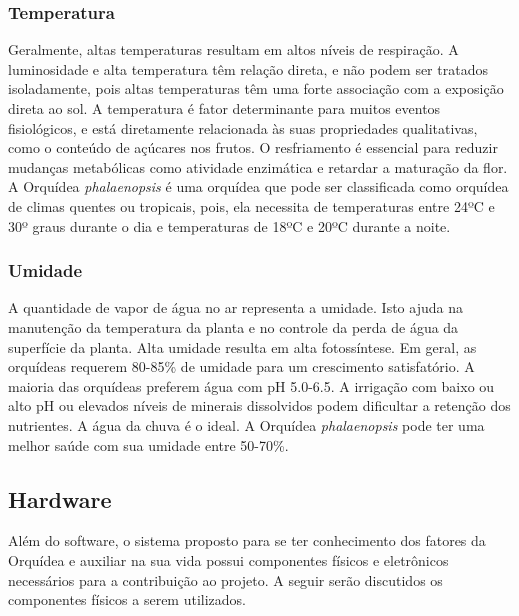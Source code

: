 \documentclass[conference]{IEEEtran}
\begin{document}
\subsubsection{Temperatura}
Geralmente, altas temperaturas resultam em altos níveis de respiração. A luminosidade e alta temperatura têm relação direta, e não podem ser tratados isoladamente, pois altas temperaturas têm uma forte associação com a exposição direta ao sol. A temperatura é fator determinante para muitos eventos fisiológicos, e está diretamente relacionada às suas propriedades qualitativas, como o conteúdo de açúcares nos frutos. O resfriamento é essencial para reduzir mudanças metabólicas como atividade enzimática e retardar a maturação da flor. \cite{b3, b4, b5} A Orquídea {\itshape{phalaenopsis}} é uma orquídea que pode ser classificada como orquídea de climas quentes ou tropicais, pois, ela necessita de temperaturas entre 24ºC e 30º graus durante o dia e temperaturas de 18ºC e 20ºC durante a noite. \cite{b6, b7}

\subsubsection{Umidade}
A quantidade de vapor de água no ar representa a umidade. Isto ajuda na manutenção da temperatura da planta e no controle da perda de água da superfície da planta. Alta umidade resulta em alta fotossíntese. Em geral, as orquídeas requerem 80-85\% de umidade para um crescimento satisfatório. A maioria das orquídeas preferem água com pH 5.0-6.5. A irrigação com baixo ou alto pH ou elevados níveis de minerais dissolvidos podem dificultar a retenção dos nutrientes. A água da chuva é o ideal. A Orquídea {\itshape{phalaenopsis}} pode ter uma melhor saúde com sua umidade entre 50-70\%. \cite{b1, b4, b5, b6, b7}

\subsection{Hardware}
Além do software, o sistema proposto para se ter conhecimento dos fatores da Orquídea e auxiliar na sua vida possui componentes físicos e eletrônicos necessários para a contribuição ao projeto. A seguir serão discutidos os componentes físicos a serem utilizados.
\end{document}
